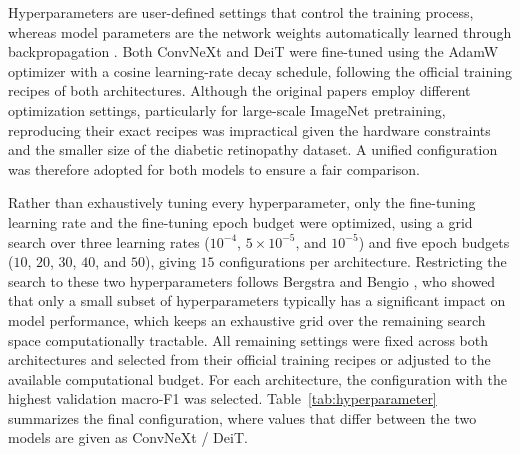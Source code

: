 Hyperparameters are user-defined settings that control the training process, whereas model parameters are the network weights automatically learned through backpropagation \cite{Bengio2000}.
Both ConvNeXt and DeiT were fine-tuned using the AdamW optimizer \cite{loshchilov2019decoupledweightdecayregularization} with a cosine learning-rate decay schedule, following the official training recipes of both architectures.
Although the original papers employ different optimization settings, particularly for large-scale ImageNet pretraining, reproducing their exact recipes was impractical given the hardware constraints and the smaller size of the diabetic retinopathy dataset.
A unified configuration was therefore adopted for both models to ensure a fair comparison.

Rather than exhaustively tuning every hyperparameter, only the fine-tuning learning rate and the fine-tuning epoch budget were optimized, using a grid search over three learning rates ($10^{-4}$, $5\times10^{-5}$, and $10^{-5}$) and five epoch budgets ($10$, $20$, $30$, $40$, and $50$), giving $15$ configurations per architecture.
Restricting the search to these two hyperparameters follows Bergstra and Bengio \cite{JMLR:v13:bergstra12a}, who showed that only a small subset of hyperparameters typically has a significant impact on model performance, which keeps an exhaustive grid over the remaining search space computationally tractable.
All remaining settings were fixed across both architectures and selected from their official training recipes or adjusted to the available computational budget.
For each architecture, the configuration with the highest validation macro-F1 was selected.
Table~\ref{tab:hyperparameter} summarizes the final configuration, where values that differ between the two models are given as ConvNeXt / DeiT.

